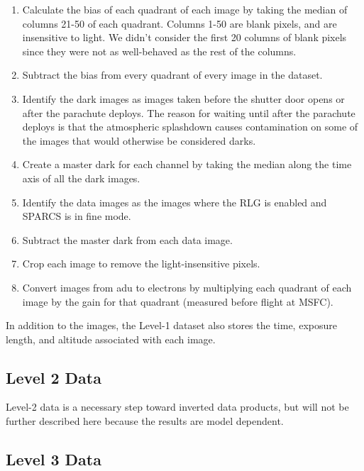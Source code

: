     	\begin{enumerate}
    	    \item Calculate the bias of each quadrant of each image by taking the median of 
    	    columns 21-50 of each quadrant. Columns 1-50 are blank pixels, and are insensitive to light. We didn't consider the first 20 columns of blank pixels since they were not as well-behaved as the rest of the columns.
    	    \item Subtract the bias from every quadrant of every image in the dataset.
    	    \item Identify the dark images as images taken before the shutter door opens or after the parachute deploys.
    	    The reason for waiting until after the parachute deploys is that the atmospheric splashdown causes contamination on some of the images that would otherwise be considered darks.
    	    \item Create a master dark for each channel by taking the median along the time axis of all the dark images.
    	    \item Identify the data images as the images where the RLG is enabled and SPARCS is in fine mode.
    	    \item Subtract the master dark from each data image.
    	    \item Crop each image to remove the light-insensitive pixels.
    	    \item Convert images from adu to electrons by multiplying each quadrant of each image by the gain for that quadrant (measured before flight at MSFC).
    	\end{enumerate}
    	
	In addition to the images, the Level-1 dataset also stores the time, exposure length, and altitude associated with each image.

	\subsection{Level 2 Data}
	Level-2 data is a necessary step toward inverted data products,  but will not be further described here because the results are model dependent. 

    \subsection{Level 3 Data}
 
